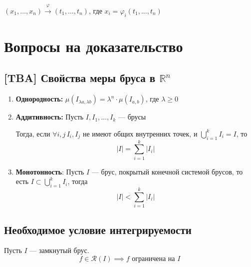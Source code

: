 \documentclass[a4paper]{article}
\begin{document}
\comment $(x_1,\ldots,x_n)\overset{\varphi}{\longrightarrow}(t_1,\ldots,t_n)$, где $x_i=\varphi_i(t_1,\ldots,t_n)$

\newpage
\section{Вопросы на доказательство}
\subsection{[TBA] Свойства меры бруса в $\mathbb{R}^n$}
\begin{enumerate}
    \item \textbf{Однородность:} $\mu(I_{\lambda a,\lambda b})=\lambda^n\cdot\mu(I_{a,b})$, где $\lambda\geqslant
    0$
    \item \textbf{Аддитивность:} Пусть $I, I_1, \ldots, I_k$ — брусы
    
    Тогда, если $\forall i, j\, I_i, I_j$ не имеют общих внутренних точек, и $\displaystyle\bigcup_{i=1}^kI_i = I$, то
    $$|I| = \sum_{i=1}^k|I_i|$$
    \item \textbf{Монотонность}: Пусть $I$ — брус, покрытый конечной системой брусов, то есть $I\subset \displaystyle\bigcup_{i=1}^kI_i$, тогда
    $$|I| < \sum_{i=1}^k|I_i|$$
\end{enumerate}

\subsection{Необходимое условие интегрируемости}
\theorem Пусть $I$ — замкнутый брус. 
\begin{equation*}
    f\in \mathcal{R}(I) \implies f \text{ ограничена на } I
\end{equation*}
\end{document}
